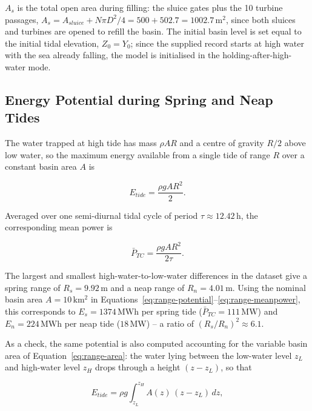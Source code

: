 $A_s$ is the total open area during filling: the sluice gates plus the 10 turbine passages, $A_s = A_{sluice} + N\pi D^2/4 = 500 + 502.7 = 1002.7\,\mathrm{m^2}$, since both sluices and turbines are opened to refill the basin. The initial basin level is set equal to the initial tidal elevation, $Z_0=Y_0$; since the supplied record starts at high water with the sea already falling, the model is initialised in the holding-after-high-water mode.

\subsection{Energy Potential during Spring and Neap Tides}
\label{sec:range-potential}
The water trapped at high tide has mass $\rho A R$ and a centre of gravity $R/2$ above low water, so the maximum energy available from a single tide of range $R$ over a constant basin area $A$ is

\begin{equation}
    E_{tide} = \frac{\rho g A R^2}{2}.
    \label{eq:range-potential}
\end{equation}

Averaged over one semi-diurnal tidal cycle of period $\tau \approx 12.42\,\mathrm{h}$, the corresponding mean power is

\begin{equation}
    \bar{P}_{TC} = \frac{\rho g A R^2}{2\tau}.
    \label{eq:range-meanpower}
\end{equation}

The largest and smallest high-water-to-low-water differences in the dataset give a spring range of $R_s = 9.92\,\mathrm{m}$ and a neap range of $R_n = 4.01\,\mathrm{m}$. Using the nominal basin area $A=10\,\mathrm{km^2}$ in Equations~\eqref{eq:range-potential}--\eqref{eq:range-meanpower}, this corresponds to $E_s = 1374\,\mathrm{MWh}$ per spring tide ($\bar{P}_{TC}=111\,\mathrm{MW}$) and $E_n = 224\,\mathrm{MWh}$ per neap tide ($18\,\mathrm{MW}$) -- a ratio of $(R_s/R_n)^2 \approx 6.1$.

As a check, the same potential is also computed accounting for the variable basin area of Equation~\eqref{eq:range-area}: the water lying between the low-water level $z_L$ and high-water level $z_H$ drops through a height $(z-z_L)$, so that

\begin{equation}
    E_{tide} = \rho g \int_{z_L}^{z_H} A(z)\,(z-z_L)\,dz,
    \label{eq:range-potential-var}
\end{equation}

